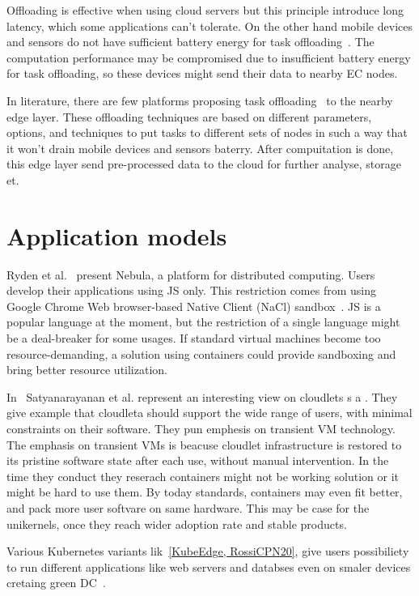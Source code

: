 Offloading is effective when using cloud servers but this principle introduce long latency, which some applications can't tolerate. On the other hand mobile devices and sensors do not have sufficient battery energy for task offloading~\cite{MaoZL16}. The computation performance may be compromised due to insufficient battery energy for task offloading, so these devices might send their data to nearby EC nodes.

In literature, there are few platforms proposing task offloading~\cite{ShiHPANZ14, KhuneP19, ChenHLLW15, LinLJL19, JiangCGZW19, MaoZL16} to the nearby edge layer. These offloading techniques are based on different parameters, options, and techniques to put tasks to different sets of nodes in such a way that it won't drain mobile devices and sensors baterry. After compuitation is done, this edge layer send pre-processed data to the cloud for further analyse, storage et. 
%
%
\section{Application models}\label{sec:applications}
%
Ryden et al.~\cite{RydenOCW14} present Nebula, a platform for distributed computing. Users develop their applications using JS only. This restriction comes from using Google Chrome Web browser-based Native Client (NaCl) sandbox~\cite{YeeSDCMOONF10}. JS is a popular language at the moment, but the restriction of a single language might be a deal-breaker for some usages. If standard virtual machines become too resource-demanding, a solution using containers could provide sandboxing and bring better resource utilization.

In~\cite{SatyanarayananBCD09} Satyanarayanan et al. represent an interesting view on cloudlets s a . They give example that cloudleta should support the wide range of users, with minimal constraints on their software. They pun emphesis on transient VM technology. The emphasis on transient VMs is beacuse cloudlet infrastructure is restored to its pristine software state after each use, without manual intervention. In the time they conduct they reserach containers might not be working solution or it might be hard to use them. By today standards, containers may even fit better, and pack more user softvare on same hardware. This may be case for the unikernels, once they reach wider adoption rate and stable products.

Various Kubernetes variants lik~\ref{KubeEdge, RossiCPN20}, give users possibiliety to run different applications like web servers and databses even on smaler devices cretaing green DC~\cite{ArocaG12}.

